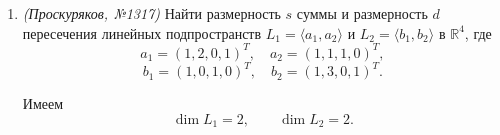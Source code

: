 \begin{enumerate}
Найдём размерности $V_1$ и $V_2$:
\[
\begin{pmatrix}
    1 & 0 & -3 & -2 \\
    7 & 1 & 9 & 14 \\
    -4 & 1 & 2 & -9
\end{pmatrix}
\xrightarrow{\,\, (2)-7(1),\ (3)+4(1) \,\,}
\begin{pmatrix}
    1 & 0 & -3 & -2 \\
    0 & 1 & 30 & 28 \\
    0 & 1 & -10 & -17
\end{pmatrix}
\xrightarrow{\,\, (3)-(2) \,\,}
\begin{pmatrix}
    1 & 0 & -3 & -2 \\
    0 & 1 & 30 & 28 \\
    0 & 0 & -40 & -45
\end{pmatrix}.
\]

Поэтому
\[
\dim V_1 = 3,
\qquad
\text{базис } V_1:\ a_1,a_2,a_3.
\]

Для $V_2$:
\[
\begin{pmatrix}
    10 & 1 & 0 & 8 \\
    -3 & 0 & 1 & -3
\end{pmatrix}
\]
строки линейно независимы, значит
\[
\dim V_2 = 2,
\qquad
\text{базис } V_2:\ b_1,b_2.
\]

Видим, что
\[
b_1 = 3a_1 + a_2,
\qquad
b_2 = -\frac45 a_1 - \frac15 a_2 + \frac15 a_3,
\]
то есть $V_2 \subset V_1$.

Тогда
\[
V_1 + V_2 = V_1,
\qquad
\dim(V_1+V_2)=3,
\]
а также
\[
V_1 \cap V_2 = V_2,
\qquad
\dim(V_1\cap V_2)=2.
\]

Следовательно,
\[
\text{базис суммы: } a_1,a_2,a_3,
\qquad
\text{базис пересечения: } b_1,b_2.
\]

\item \textit{(Проскуряков, №1317)} Найти размерность $s$ суммы и размерность $d$ пересечения линейных подпространств $L_1 = \langle a_1, a_2 \rangle$ и $L_2 = \langle b_1, b_2 \rangle$ в $\mathbb{R}^4$, где
\[
a_1 = (1, 2, 0, 1)^T, \quad a_2 = (1, 1, 1, 0)^T,
\]
\[
b_1 = (1, 0, 1, 0)^T, \quad b_2 = (1, 3, 0, 1)^T.
\]

Имеем
\[
\dim L_1 = 2, \qquad \dim L_2 = 2.
\]


\end{enumerate}
